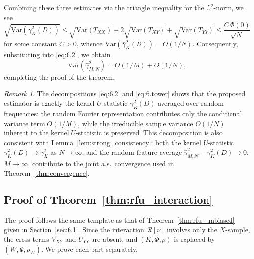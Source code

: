 \documentclass[11pt,leqno]{article}
\theoremstyle{plain}
\theoremstyle{remark}
\newtheorem{rem}[thm]{Remark}
\theoremstyle{definition}
\numberwithin{equation}{section}
\numberwithin{figure}{section}
\numberwithin{table}{section}
\numberwithin{algorithm}{section}
\begin{document}
Combining these three estimates via the triangle inequality for the $L^2$-norm, we see 
\[
 \sqrt{\mathrm{Var}(\bar{\gamma}_K^2(D))}
 \le \sqrt{\mathrm{Var}(T_{XX})} + 2\sqrt{\mathrm{Var}(T_{XY})} + \sqrt{\mathrm{Var}(T_{YY})}
 \le \frac{C\,\Phi(0)}{\sqrt{N}}
\]
for some constant $C > 0$, whence $\mathrm{Var}(\bar{\gamma}_K^2(D)) = O(1/N)$.
Consequently, substituting into \eqref{eq:6.2}, we obtain
\[
 \mathrm{Var}(\hat{\gamma}_{M,N}^2) = O(1/M) + O(1/N), 
\]
completing the proof of the theorem. 

\begin{rem}\label{rem:6.var}
The decompositions \eqref{eq:6.2} and \eqref{eq:6.tower} shows that the proposed estimator
is exactly the kernel $U$-statistic $\bar{\gamma}_K^2(D)$ averaged over random frequencies:
the random Fourier representation contributes only the conditional variance term $O(1/M)$,
while the irreducible sample variance $O(1/N)$ inherent to the kernel $U$-statistic is preserved.
This decomposition is also consistent with Lemma~\ref{lem:strong_consistency}:
both the kernel $U$-statistic $\bar{\gamma}_K^2(D)\to\gamma_K^2$ as $N\to\infty$,
and the random-feature average $\hat{\gamma}_{M,N}^2 - \bar{\gamma}_K^2(D)\to 0$, $M\to\infty$,
contribute to the joint a.s.\ convergence used in Theorem~\ref{thm:convergence}.
\end{rem}


\subsection{Proof of Theorem~\ref{thm:rfu_interaction}}\label{sec:6.1interaction}

The proof follows the same template as that of Theorem~\ref{thm:rfu_unbiased} given in Section~\ref{sec:6.1}.
Since the interaction $\mathcal{R}[\nu]$ involves only the $X$-sample,
the cross terms $V_{XY}$ and $U_{YY}$ are absent, and $(K,\Phi,\rho)$ is replaced by $(W,\Psi,\rho_W)$.
We prove each part separately.
\end{document}
